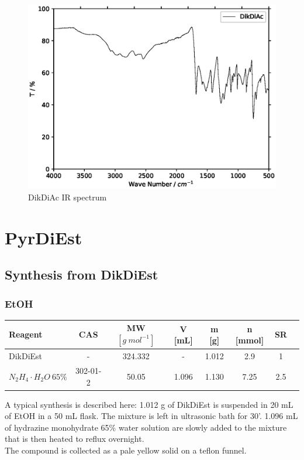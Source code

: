 \documentclass[../Master.tex]{subfiles}
\begin{document}
\begin{figure}[h!]
	\centering
	\includegraphics[width=12cm,keepaspectratio]{Spectra/ir/DikDiAc.eps}
	\caption{DikDiAc IR spectrum}
\end{figure}

\section{PyrDiEst}
\subsection{Synthesis from DikDiEst}
\subsubsection{EtOH}
\begin{center}
	\begin{tabular}[b]{lccccccc}
		\toprule
		Reagent                      & CAS      & MW \([g \ mol^{-1}]\) & V [mL] & m [g] & n [mmol] & SR  \\
		\midrule
		DikDiEst                     & -        & 324.332               & -      & 1.012 & 2.9      & 1   \\
		\(N_2H_4 \cdot H_2O \ 65\%\) & 302-01-2 & 50.05                 & 1.096  & 1.130 & 7.25     & 2.5 \\
		\bottomrule
	\end{tabular}
\end{center}
A typical synthesis is described here:
1.012 g of DikDiEst is suspended in 20 mL of EtOH in a 50 mL flask. The mixture is left in ultrasonic bath for 30'. 1.096 mL of hydrazine monohydrate 65\% water solution  are slowly added to the mixture that is then heated to reflux overnight.\\
The compound is collected as a pale yellow solid on a teflon funnel.
\newpage
\end{document}
